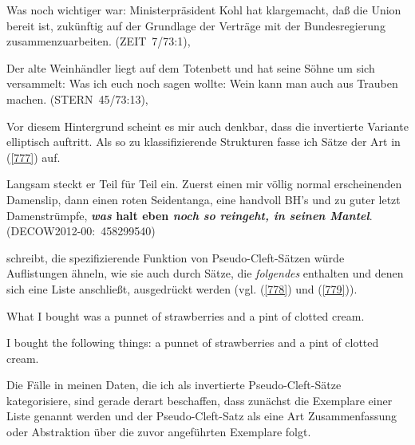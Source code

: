\begin{exe}
	\ex\label{775} 
	\scriptsize
	Was noch wichtiger war: Ministerpräsident Kohl hat klargemacht, daß die Union bereit ist, \glqq zukünftig auf der Grundlage 	der Verträge mit der Bundesregierung zusammenzuarbeiten\grqq{}. 	
	\newline
	\hbox{}\hfill\hbox{(ZEIT 7/73:1), \citet[74-75]{Dyhr1978}}	
\end{exe}

\begin{exe}
	\ex\label{776} 
	\scriptsize
	Der alte Weinhändler liegt auf dem Totenbett und hat seine Söhne um sich versammelt: \glqq Was ich euch noch sagen wollte: 		Wein kann man auch aus Trauben machen\grqq{}. 	
	\newline
	\hbox{}\hfill\hbox{(STERN 45/73:13), \citet[93]{Dyhr1978}}	
\end{exe}
Vor diesem Hintergrund scheint es mir auch denkbar, dass die invertierte Variante elliptisch auftritt. Als so zu klassifizierende Strukturen fasse ich Sätze der Art in (\ref{777}) auf.

\begin{exe}
	\ex\label{777} 
	\scriptsize
	Langsam steckt er Teil für Teil ein. Zuerst einen mir völlig normal erscheinenden Damenslip, dann einen roten Seidentanga, 		eine handvoll BH's und zu guter letzt Damenstrümpfe, \textbf{\textit{was} halt eben \textit{noch so reingeht, in seinen 		Mantel}}. 
	\hfill\hbox {(DECOW2012-00: 458299540)}
\end{exe}
\citet[95]{Higgins1976} schreibt, die spezifizierende Funktion von Pseudo-Cleft-Sätzen würde Auflistungen ähneln, wie sie auch durch Sätze, die \textit{folgendes} ent\-halten und denen sich eine Liste anschließt, ausgedrückt werden (vgl. (\ref{778}) und (\ref{779})).
	
\begin{exe}
	\ex\label{778} 
	What I bought was a punnet of strawberries and a pint of clotted cream.
\end{exe}	
\vspace{-0.65cm}	
\begin{exe}
	\ex\label{779} 
	I bought the following things: a punnet of strawberries and a pint of clotted cream.
\end{exe}	
Die Fälle in meinen Daten, die ich als invertierte Pseudo-Cleft-Sätze kategorisiere, sind gerade derart beschaffen, dass zunächst die Exemplare einer Liste genannt werden und der Pseudo-Cleft-Satz als eine Art Zusammenfassung oder Abstraktion über die zuvor angeführten Exemplare folgt. 

